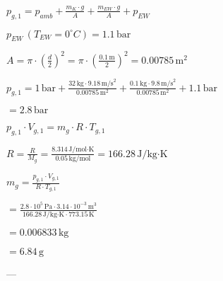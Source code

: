 \( p_{g,1} = p_{amb} + \frac{m_K \cdot g}{A} + \frac{m_{EW} \cdot g}{A} + p_{EW} \)  

\( p_{EW} \, (T_{EW} = 0^\circ C) = 1.1 \, \text{bar} \)  

\( A = \pi \cdot \left(\frac{d}{2}\right)^2 = \pi \cdot \left(\frac{0.1 \, \text{m}}{2}\right)^2 = 0.00785 \, \text{m}^2 \)  

\( p_{g,1} = 1 \, \text{bar} + \frac{32 \, \text{kg} \cdot 9.18 \, \text{m/s}^2}{0.00785 \, \text{m}^2} + \frac{0.1 \, \text{kg} \cdot 9.8 \, \text{m/s}^2}{0.00785 \, \text{m}^2} + 1.1 \, \text{bar} \)  

\( = 2.8 \, \text{bar} \)  

\( p_{g,1} \cdot V_{g,1} = m_g \cdot R \cdot T_{g,1} \)  

\( R = \frac{R}{M_g} = \frac{8.314 \, \text{J/mol·K}}{0.05 \, \text{kg/mol}} = 166.28 \, \text{J/kg·K} \)  

\( m_g = \frac{p_{g,1} \cdot V_{g,1}}{R \cdot T_{g,1}} \)  

\( = \frac{2.8 \cdot 10^5 \, \text{Pa} \cdot 3.14 \cdot 10^{-3} \, \text{m}^3}{166.28 \, \text{J/kg·K} \cdot 773.15 \, \text{K}} \)  

\( = 0.006833 \, \text{kg} \)  

\( = 6.84 \, \text{g} \)  

---